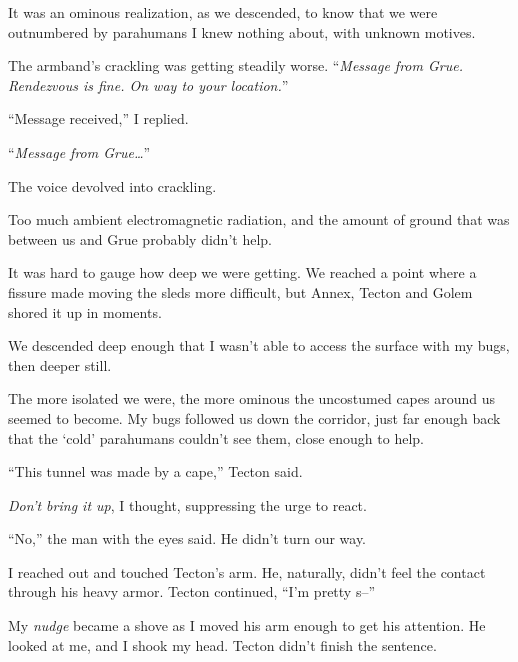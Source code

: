 It was an ominous realization, as we descended, to know that we were outnumbered by parahumans I knew nothing about, with unknown motives.



The armband's crackling was getting steadily worse.  ``\emph{Message from Grue.  Rendezvous is fine.  On way to your location.}''



``Message received,'' I replied.



``\emph{Message from Grue\ldots}''



The voice devolved into crackling.



Too much ambient electromagnetic radiation, and the amount of ground that was between us and Grue probably didn't help.



It was hard to gauge how deep we were getting.  We reached a point where a fissure made moving the sleds more difficult, but Annex, Tecton and Golem shored it up in moments.



We descended deep enough that I wasn't able to access the surface with my bugs, then deeper still.



The more isolated we were, the more ominous the uncostumed capes around us seemed to become.  My bugs followed us down the corridor, just far enough back that the `cold' parahumans couldn't see them, close enough to help.



``This tunnel was made by a cape,'' Tecton said.



\emph{Don't bring it up}, I thought, suppressing the urge to react.



``No,'' the man with the eyes said.  He didn't turn our way.



I reached out and touched Tecton's arm.  He, naturally, didn't feel the contact through his heavy armor.  Tecton continued, ``I'm pretty s--''



My \emph{nudge} became a shove as I moved his arm enough to get his attention.  He looked at me, and I shook my head.  Tecton didn't finish the sentence.



